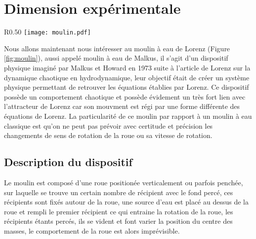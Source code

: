 \section{Dimension expérimentale}
\begin{wrapfigure}{R}{0.50\textwidth}
    \centering
    \texttt{[image: moulin.pdf]}
    \caption{\label{fig:moulin}Moulin de Lorenz réalisé par l'université de Harvard} 
\end{wrapfigure}
Nous allons maintenant nous intéresser au moulin à eau de Lorenz (Figure \ref{fig:moulin}), aussi appelé moulin à eau de Malkus, il s'agit d'un dispositif physique imaginé par Malkus et Howard en 1973 suite à l'article de
Lorenz sur la dynamique chaotique en hydrodynamique, leur objectif était de créer un système physique permettant de retrouver les équations établies par Lorenz. Ce dispositif possède un comportement chaotique et possède évidement un très fort lien avec l'attracteur de Lorenz car son mouvment est régi par une forme différente des équations de Lorenz. La particularité de ce moulin par rapport à un moulin à eau classique est qu'on ne peut pas prévoir avec certitude et précision les changements de sens de rotation de la roue ou sa vitesse de rotation.

\subsection{Description du dispositif}
Le moulin est composé d'une roue positionée verticalement ou parfois penchée, sur laquelle se trouve un certain nombre de récipient avec le fond percé, ces récipients sont fixés autour de la roue, une source d'eau est placé au dessus de la roue et rempli le premier récipient ce qui entraine la rotation de la roue, les récipients étants percés, ils se vident et font varier la position du centre des masses, le comportement de la roue est alors imprévisible.

